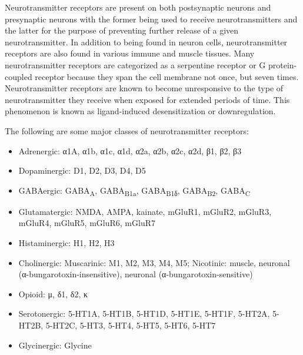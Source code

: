 \documentclass[]{book}
\providecommand{\tightlist}{%
  \setlength{\itemsep}{0pt}\setlength{\parskip}{0pt}}
\begin{document}
Neurotransmitter receptors are present on both postsynaptic neurons and presynaptic neurons with the former being used to receive neurotransmitters and the latter for the purpose of preventing further release of a given neurotransmitter. In addition to being found in neuron cells, neurotransmitter receptors are also found in various immune and muscle tissues. Many neurotransmitter receptors are categorized as a serpentine receptor or G protein-coupled receptor because they span the cell membrane not once, but seven times. Neurotransmitter receptors are known to become unresponsive to the type of neurotransmitter they receive when exposed for extended periods of time. This phenomenon is known as ligand-induced desensitization or downregulation.

The following are some major classes of neurotransmitter receptors:

\begin{itemize}
\tightlist
\item
  Adrenergic: α1A, α1b, α1c, α1d, α2a, α2b, α2c, α2d, β1, β2, β3
\item
  Dopaminergic: D1, D2, D3, D4, D5
\item
  GABAergic: GABA\textsubscript{A}, GABA\textsubscript{B1a}, GABA\textsubscript{B1δ}, GABA\textsubscript{B2}, GABA\textsubscript{C}
\item
  Glutamatergic: NMDA, AMPA, kainate, mGluR1, mGluR2, mGluR3, mGluR4, mGluR5, mGluR6, mGluR7
\item
  Histaminergic: H1, H2, H3
\item
  Cholinergic: Muscarinic: M1, M2, M3, M4, M5; Nicotinic: muscle, neuronal (α-bungarotoxin-insensitive), neuronal (α-bungarotoxin-sensitive)
\item
  Opioid: μ, δ1, δ2, κ
\item
  Serotonergic: 5-HT1A, 5-HT1B, 5-HT1D, 5-HT1E, 5-HT1F, 5-HT2A, 5-HT2B, 5-HT2C, 5-HT3, 5-HT4, 5-HT5, 5-HT6, 5-HT7
\item
  Glycinergic: Glycine
\end{itemize}
\end{document}

